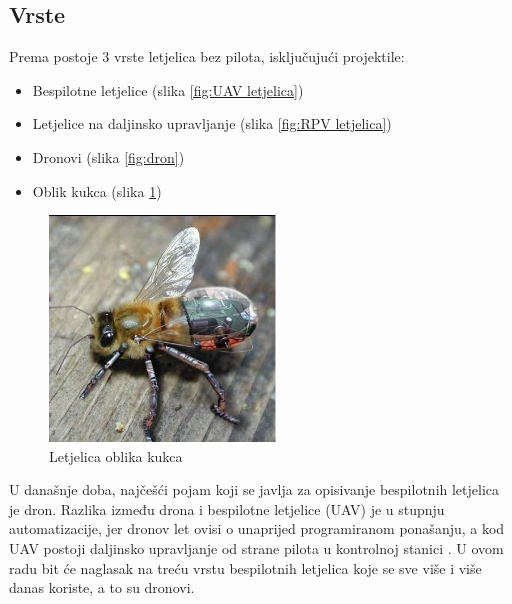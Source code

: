 \documentclass[times, utf8, diplomski]{fer}
\begin{document}
\subsection{Vrste}
Prema \citet{Systems} postoje  3  vrste  letjelica  bez  pilota,  isključujući 
projektile: \begin{itemize}
\item Bespilotne letjelice  (slika \ref{fig:UAV letjelica})
\item Letjelice na daljinsko upravljanje  (slika \ref{fig:RPV letjelica})
\item Dronovi  (slika \ref{fig:dron})
\item Oblik kukca  (slika \ref{fig:oblik kukca})
\end{itemize}
\begin{figure}[htb]
\centering
\includegraphics[width=6cm]{img/insect_fly_shaped_drone.png}
\caption{Letjelica oblika kukca\protect\footnotemark}
\label{fig:oblik kukca}
\end{figure}
U današnje doba, najčešći pojam koji se javlja za opisivanje bespilotnih letjelica je dron. Razlika između drona i bespilotne letjelice (UAV) je u stupnju automatizacije, jer dronov let ovisi o unaprijed programiranom ponašanju, a kod UAV postoji daljinsko upravljanje od strane pilota  u  kontrolnoj  stanici \citep{UAVInsider}. U ovom radu bit će naglasak na treću vrstu bespilotnih letjelica koje se sve više i više danas koriste, a to su dronovi. 
\end{document}
